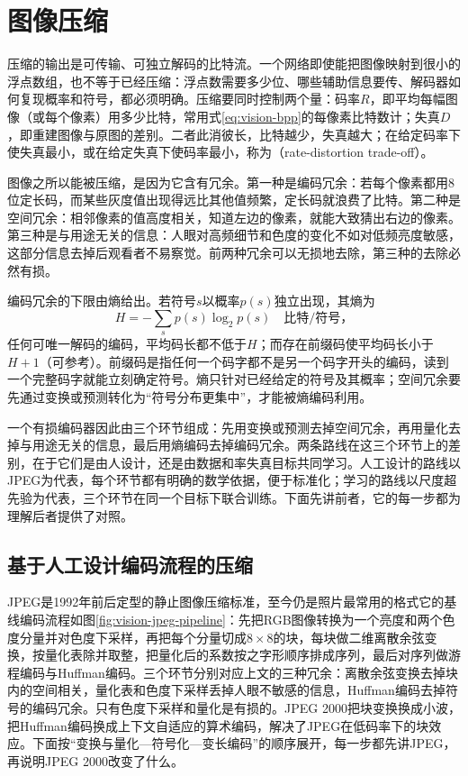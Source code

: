 \section{图像压缩}
\label{sec:vision-restoration-compression}

压缩的输出是可传输、可独立解码的比特流。一个网络即使能把图像映射到很小的浮点数组，也不等于已经压缩：浮点数需要多少位、哪些辅助信息要传、解码器如何复现概率和符号，都必须明确。压缩要同时控制两个量：码率$R$，即平均每幅图像（或每个像素）用多少比特，常用式\eqref{eq:vision-bpp}的每像素比特数计；失真$D$，即重建图像与原图的差别。二者此消彼长，比特越少，失真越大；在给定码率下使失真最小，或在给定失真下使码率最小，称为（rate-distortion trade-off）。

图像之所以能被压缩，是因为它含有冗余。第一种是编码冗余：若每个像素都用8位定长码，而某些灰度值出现得远比其他值频繁，定长码就浪费了比特。第二种是空间冗余：相邻像素的值高度相关，知道左边的像素，就能大致猜出右边的像素。第三种是与用途无关的信息：人眼对高频细节和色度的变化不如对低频亮度敏感，这部分信息去掉后观看者不易察觉。前两种冗余可以无损地去除，第三种的去除必然有损。

编码冗余的下限由熵给出。若符号$s$以概率$p(s)$独立出现，其熵为
\begin{equation}
 H=-\sum_{s}p(s)\log_2p(s)\quad\text{比特/符号}\text{，}
 \label{eq:vision-entropy}
\end{equation}
任何可唯一解码的编码，平均码长都不低于$H$；而存在前缀码使平均码长小于$H+1$（可参考）。前缀码是指任何一个码字都不是另一个码字开头的编码，读到一个完整码字就能立刻确定符号。熵只针对已经给定的符号及其概率；空间冗余要先通过变换或预测转化为“符号分布更集中”，才能被熵编码利用。

一个有损编码器因此由三个环节组成：先用变换或预测去掉空间冗余，再用量化去掉与用途无关的信息，最后用熵编码去掉编码冗余。两条路线在这三个环节上的差别，在于它们是由人设计，还是由数据和率失真目标共同学习。人工设计的路线以JPEG为代表，每个环节都有明确的数学依据，便于标准化；学习的路线以尺度超先验为代表，三个环节在同一个目标下联合训练。下面先讲前者，它的每一步都为理解后者提供了对照。

\subsection{基于人工设计编码流程的压缩}
\label{sec:vision-restoration-classic-codec}

JPEG是1992年前后定型的静止图像压缩标准，至今仍是照片最常用的格式它的基线编码流程如图\ref{fig:vision-jpeg-pipeline}：先把RGB图像转换为一个亮度和两个色度分量并对色度下采样，再把每个分量切成$8\times8$的块，每块做二维离散余弦变换，按量化表除并取整，把量化后的系数按之字形顺序排成序列，最后对序列做游程编码与Huffman编码。三个环节分别对应上文的三种冗余：离散余弦变换去掉块内的空间相关，量化表和色度下采样丢掉人眼不敏感的信息，Huffman编码去掉符号的编码冗余。只有色度下采样和量化是有损的。JPEG 2000把块变换换成小波，把Huffman编码换成上下文自适应的算术编码，解决了JPEG在低码率下的块效应。下面按“变换与量化—符号化—变长编码”的顺序展开，每一步都先讲JPEG，再说明JPEG 2000改变了什么。

